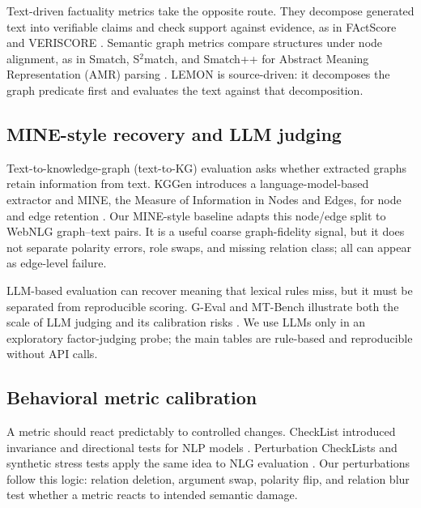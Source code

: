 Text-driven factuality metrics take the opposite route. They decompose generated text into verifiable claims and check support against evidence, as in FActScore and VERISCORE \cite{min2023factscore,sun2024veriscore}. Semantic graph metrics compare structures under node alignment, as in Smatch, S$^2$match, and Smatch++ for Abstract Meaning Representation (AMR) parsing \cite{cai2013smatch,opitz2020s2match,opitz2023smatchpp}. LEMON is source-driven: it decomposes the graph predicate first and evaluates the text against that decomposition.

\subsection{MINE-style recovery and LLM judging}
Text-to-knowledge-graph (text-to-KG) evaluation asks whether extracted graphs retain information from text. KGGen introduces a language-model-based extractor and MINE, the Measure of Information in Nodes and Edges, for node and edge retention \cite{mo2025kggen}. Our MINE-style baseline adapts this node/edge split to WebNLG graph--text pairs. It is a useful coarse graph-fidelity signal, but it does not separate polarity errors, role swaps, and missing relation class; all can appear as edge-level failure.

LLM-based evaluation can recover meaning that lexical rules miss, but it must be separated from reproducible scoring. G-Eval and MT-Bench illustrate both the scale of LLM judging and its calibration risks \cite{liu2023geval,zheng2023mtbench}. We use LLMs only in an exploratory factor-judging probe; the main tables are rule-based and reproducible without API calls.

\subsection{Behavioral metric calibration}
A metric should react predictably to controlled changes. CheckList introduced invariance and directional tests for NLP models \cite{ribeiro2020checklist}. Perturbation CheckLists and synthetic stress tests apply the same idea to NLG evaluation \cite{sai2021perturbation,he2023blindspots}. Our perturbations follow this logic: relation deletion, argument swap, polarity flip, and relation blur test whether a metric reacts to intended semantic damage.

